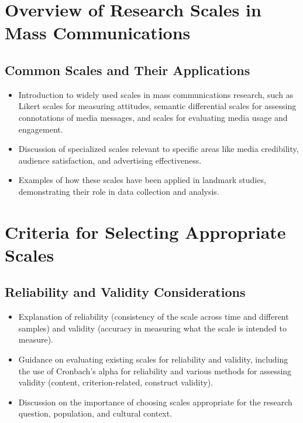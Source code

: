 \documentclass[
]{book}
\begin{document}
\hypertarget{overview-of-research-scales-in-mass-communications}{%
\section*{Overview of Research Scales in Mass Communications}\label{overview-of-research-scales-in-mass-communications}}

\hypertarget{common-scales-and-their-applications}{%
\subsection*{Common Scales and Their Applications}\label{common-scales-and-their-applications}}

\begin{itemize}
\item
  Introduction to widely used scales in mass communications research, such as Likert scales for measuring attitudes, semantic differential scales for assessing connotations of media messages, and scales for evaluating media usage and engagement.
\item
  Discussion of specialized scales relevant to specific areas like media credibility, audience satisfaction, and advertising effectiveness.
\item
  Examples of how these scales have been applied in landmark studies, demonstrating their role in data collection and analysis.
\end{itemize}

\hypertarget{criteria-for-selecting-appropriate-scales}{%
\section*{Criteria for Selecting Appropriate Scales}\label{criteria-for-selecting-appropriate-scales}}

\hypertarget{reliability-and-validity-considerations}{%
\subsection*{Reliability and Validity Considerations}\label{reliability-and-validity-considerations}}

\begin{itemize}
\item
  Explanation of reliability (consistency of the scale across time and different samples) and validity (accuracy in measuring what the scale is intended to measure).
\item
  Guidance on evaluating existing scales for reliability and validity, including the use of Cronbach's alpha for reliability and various methods for assessing validity (content, criterion-related, construct validity).
\item
  Discussion on the importance of choosing scales appropriate for the research question, population, and cultural context.
\end{itemize}
\end{document}
